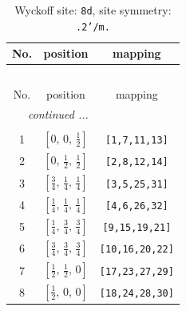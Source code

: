 \documentclass[fleqn,8pt]{jsarticle}
\begin{document}
\begin{longtable}{ccc}
\caption{Wyckoff site: {\tt 8d}, site symmetry: {\tt .2'/m.}}
 \\
 \hline \hline
No. & position & mapping \\ \hline \endfirsthead

\multicolumn{2}{l}{\tablename\ \thetable{}} \\
 \hline \hline
No. & position & mapping \\ \hline \endhead

 \hline \hline
\multicolumn{2}{r}{\footnotesize\it continued ...} \\ \endfoot

 \hline \hline
\multicolumn{2}{r}{} \\ \endlastfoot

1 & $\left[ 0,\, 0,\, \frac{1}{2} \right]$ & {\tt [1,7,11,13]} \\ \hline
2 & $\left[ 0,\, \frac{1}{2},\, \frac{1}{2} \right]$ & {\tt [2,8,12,14]} \\ \hline
3 & $\left[ \frac{3}{4},\, \frac{1}{4},\, \frac{1}{4} \right]$ & {\tt [3,5,25,31]} \\ \hline
4 & $\left[ \frac{1}{4},\, \frac{1}{4},\, \frac{1}{4} \right]$ & {\tt [4,6,26,32]} \\ \hline
5 & $\left[ \frac{1}{4},\, \frac{3}{4},\, \frac{3}{4} \right]$ & {\tt [9,15,19,21]} \\ \hline
6 & $\left[ \frac{3}{4},\, \frac{3}{4},\, \frac{3}{4} \right]$ & {\tt [10,16,20,22]} \\ \hline
7 & $\left[ \frac{1}{2},\, \frac{1}{2},\, 0 \right]$ & {\tt [17,23,27,29]} \\ \hline
8 & $\left[ \frac{1}{2},\, 0,\, 0 \right]$ & {\tt [18,24,28,30]} \\
\end{longtable}
\renewcommand{\arraystretch}{1.2}
\end{document}
